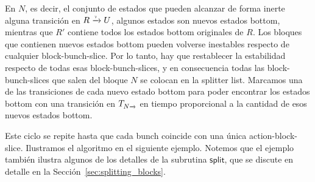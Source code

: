 En $N$, es decir, el conjunto de estados que pueden alcanzar de forma inerte alguna transición en $R \pijl{\tau} U$,
algunos estados son nuevos estados bottom, mientras que $R'$ contiene todos los estados bottom originales de $R$.
Los bloques que contienen nuevos estados bottom pueden volverse inestables respecto de cualquier
block-bunch-slice. Por lo tanto, hay que restablecer la estabilidad respecto de todas esas block-bunch-slices, y en consecuencia todas las block-bunch-slices
que salen del bloque $N$ se colocan en la splitter list.
Marcamos una de las transiciones de cada nuevo estado bottom
para poder encontrar los estados bottom con una transición en $T_{N\pijl{}}$ en tiempo proporcional a la cantidad de esos nuevos estados bottom.

Este ciclo se repite hasta que cada bunch coincide con una única action-block-slice.
Ilustramos el algoritmo en el siguiente ejemplo. Notemos que el ejemplo también ilustra algunos de los detalles de la subrutina $\mathsf{split}$, que se discute en detalle en la Sección~\ref{sec:splitting_blocks}.

